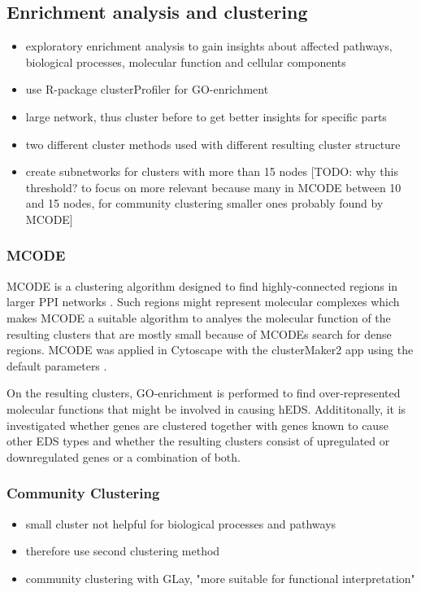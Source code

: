 \subsection{Enrichment analysis and clustering}
\begin{itemize}
	\item exploratory enrichment analysis to gain insights about affected pathways, biological processes, molecular function and cellular components
	\item use R-package clusterProfiler \cite{Wu2021} for GO-enrichment \cite{Ashburner2000,Consortium2023}
	\item large network, thus cluster before to get better insights for specific parts
	\item two different cluster methods used with different resulting cluster structure
	\item create subnetworks for clusters with more than 15 nodes [TODO: why this threshold? to focus on more relevant because many in MCODE between 10 and 15 nodes, for community clustering smaller ones probably found by MCODE]
\end{itemize}
\subsubsection{MCODE}
MCODE is a clustering algorithm designed to find highly-connected regions in larger PPI networks \cite{mcode}. Such regions might represent molecular complexes which makes MCODE a suitable algorithm to analyes the molecular function of the resulting clusters that are mostly small because of MCODEs search for dense regions. MCODE was applied in Cytoscape with the clusterMaker2 app using the default parameters \cite{clusterMaker2}.

On the resulting clusters, GO-enrichment is performed to find over-represented molecular functions that might be involved in causing hEDS. Addititonally, it is investigated whether genes are clustered together with genes known to cause other EDS types and whether the resulting clusters consist of upregulated or downregulated genes or a combination of both.
\subsubsection{Community Clustering}
\begin{itemize}
	\item small cluster not helpful for biological processes and pathways
	\item therefore use second clustering method
	\item community clustering with GLay, "more suitable for functional interpretation" \cite{GLay}
\end{itemize}